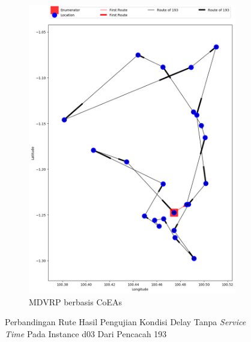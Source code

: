 \begin{figure}[H]
	\centering
	\begin{subfigure}[t]{\textwidth}
		\centering
		\includegraphics[width=\textwidth]{Resources/Images/delayed_3/real_m15_n100_delayed_3_193_coes}
		\caption{MDVRP berbasis CoEAs}
		\label{fig:real_m15_n100_delayed_3_193_coes}
	\end{subfigure}
	\caption{Perbandingan Rute Hasil Pengujian Kondisi Delay Tanpa \textit{Service Time} Pada Instance d03 Dari Pencacah 193}
	\label{fig:real_m15_n100_delayed_3_193}
\end{figure}


